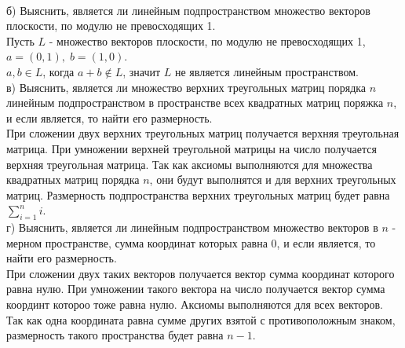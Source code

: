 \\[2em]
б) Выяснить, является ли линейным подпространством множество векторов плоскости, по модулю не превосходящих 1.
\\[1em]
Пусть $ L $ - множество векторов плоскости, по модулю не превосходящих 1, $ a = (0, 1), \; b = (1, 0) $.
\\
$ a, b \in L $, когда $ a + b \notin L $, значит $ L $ не является линейным пространством.
\\[2em]
в) Выяснить, является ли множество верхних треугольных матриц порядка $ n $ линейным подпространством
в пространстве всех квадратных матриц поряжка $ n $, и если является, то найти его размерность.
\\[1em]
При сложении двух верхних треугольных матриц получается верхняя треугольная матрица.
При умножении верхней треугольной матрицы на число получается верхняя треугольная матрица.
Так как аксиомы выполняются для множества квадратных матриц порядка $ n $, они будут выполнятся
и для верхних треугольных матриц. Размерность подпространства верхних треугольных матриц будет равна
$ \sum \limits_{i=1}^n i $.
\\[2em]
г) Выяснить, является ли линейным подпространством множество векторов в $ n $ - мерном пространстве,
сумма координат которых равна 0, и если является, то найти его размерность.
\\[1em]
При сложении двух таких векторов получается вектор сумма координат которого равна нулю.
При умножении такого вектора на число получается вектор сумма координт котороо тоже равна нулю.
Аксиомы выполняются для всех векторов. Так как одна координата равна сумме других взятой с противоположным знаком, размерность
такого пространства будет равна $ n - 1 $.
